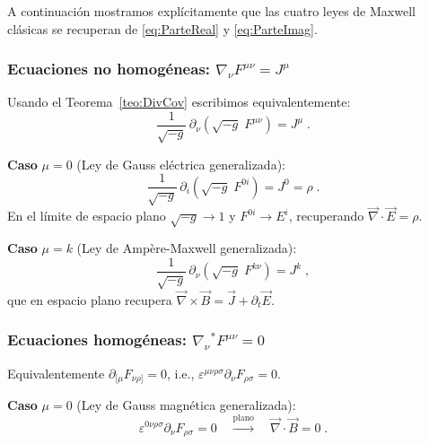             A continuación mostramos explícitamente que las cuatro leyes de Maxwell clásicas se recuperan de \eqref{eq:ParteReal} y \eqref{eq:ParteImag}.

            \subsubsection*{Ecuaciones no homogéneas: $\nabla_{\nu}F^{\mu\nu}=J^{\mu}$}

                Usando el Teorema~\ref{teo:DivCov} escribimos equivalentemente:
                \begin{equation}\label{eq:MaxNoHom_exp}
                    \frac{1}{\sqrt{-g}}\,\partial_{\nu}\!\left(\sqrt{-g}\;F^{\mu\nu}\right) = J^{\mu}\;.
                \end{equation}

                \textbf{Caso} $\mu=0$ (Ley de Gauss eléctrica generalizada):
                \begin{equation}
                    \frac{1}{\sqrt{-g}}\,\partial_{i}\!\left(\sqrt{-g}\;F^{0i}\right) = J^{0} = \rho\;.
                \end{equation}
                En el límite de espacio plano $\sqrt{-g}\to1$ y $F^{0i}\to E^i$, recuperando $\vec{\nabla}\cdot\vec{E}=\rho$.

                \textbf{Caso} $\mu=k$ (Ley de Ampère-Maxwell generalizada):
                \begin{equation}
                    \frac{1}{\sqrt{-g}}\,\partial_{\nu}\!\left(\sqrt{-g}\;F^{k\nu}\right) = J^{k}\;,
                \end{equation}
                que en espacio plano recupera $\vec{\nabla}\times\vec{B} = \vec{J}+\partial_t\vec{E}$.

            \subsubsection*{Ecuaciones homogéneas: $\nabla_{\nu}{}^{*}F^{\mu\nu}=0$}

                Equivalentemente $\partial_{[\mu}F_{\nu\rho]}=0$, i.e., $\varepsilon^{\mu\nu\rho\sigma}\partial_{\nu}F_{\rho\sigma}=0$.

                \textbf{Caso} $\mu=0$ (Ley de Gauss magnética generalizada):
                \begin{equation}
                    \varepsilon^{0\nu\rho\sigma}\partial_{\nu}F_{\rho\sigma} = 0 \quad\xrightarrow{\text{plano}}\quad \vec{\nabla}\cdot\vec{B}=0\;.
                \end{equation}


